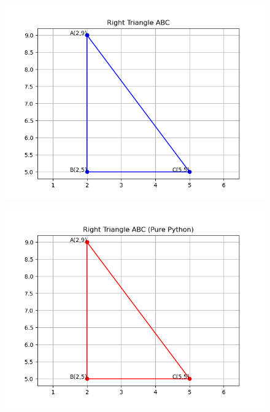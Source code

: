 \documentclass[journal]{IEEEtran}
\begin{document}
	
	\begin{figure}[H]
		\centering
		\includegraphics[width = 0.8\columnwidth]{Figure_1.png}
		\caption*{}
		\label{q3.1}
	\end{figure}
	
	\begin{figure}[H]
		\centering
		\includegraphics[width = 0.8\columnwidth]{Figure_2.png}
		\caption*{}
		\label{q3.2}
	\end{figure}
		
\end{document}
